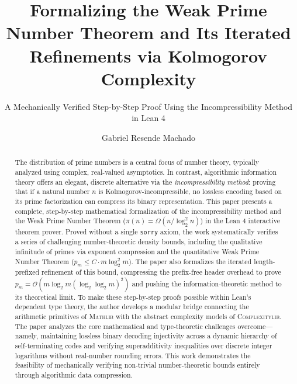 \documentclass[acmsmall,natbib=false,nonacm]{acmart}
\begin{document}
\title[Formalizing the Weak PNT in Lean 4]{Formalizing the Weak Prime Number Theorem and Its Iterated Refinements via Kolmogorov Complexity}
\subtitle{A Mechanically Verified Step-by-Step Proof Using the Incompressibility Method in Lean 4}

\author{Gabriel Resende Machado}

\begin{abstract}
The distribution of prime numbers is a central focus of number theory, typically analyzed using complex, real-valued asymptotics. In contrast, algorithmic information theory offers an elegant, discrete alternative via the \textit{incompressibility method}: proving that if a natural number $n$ is Kolmogorov-incompressible, no lossless encoding based on its prime factorization can compress its binary representation. This paper presents a complete, step-by-step mathematical formalization of the incompressibility method and the Weak Prime Number Theorem ($\pi(n) = \Omega(n / \log_2^2 n)$) in the Lean 4 interactive theorem prover. Proved without a single \texttt{sorry} axiom, the work systematically verifies a series of challenging number-theoretic density bounds, including the qualitative infinitude of primes via exponent compression and the quantitative Weak Prime Number Theorem ($p_m \le C \cdot m \log_2^2 m$). The paper also formalizes the iterated length-prefixed refinement of this bound, compressing the prefix-free header overhead to prove $p_m = \mathcal{O}(m \log_2 m (\log_2 \log_2 m)^2)$ and pushing the information-theoretic method to its theoretical limit. To make these step-by-step proofs possible within Lean's dependent type theory, the author develops a modular bridge connecting the arithmetic primitives of \textsc{Mathlib} with the abstract complexity models of \textsc{Complexitylib}. The paper analyzes the core mathematical and type-theoretic challenges overcome—namely, maintaining lossless binary decoding injectivity across a dynamic hierarchy of self-terminating codes and verifying superadditivity inequalities over discrete integer logarithms without real-number rounding errors. This work demonstrates the feasibility of mechanically verifying non-trivial number-theoretic bounds entirely through algorithmic data compression.
\end{abstract}

\end{document}
